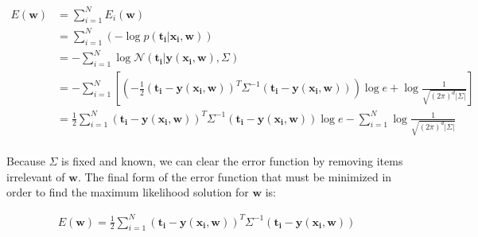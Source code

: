 \documentclass[twoside,11pt]{homework}
\newcommand{\vect}[1]{\boldsymbol{\mathbf{#1}}}
\begin{document}
\begin{align*}
E(\vect{w})
&= \sum_{i=1}^N E_i(\vect{w}) \\
&= \sum_{i=1}^N (- \log p(\vect{t_i} | \vect{x_i}, \vect{w}))\\
&= - \sum_{i=1}^N \log \mathcal{N} (\vect{t_i} | \vect{y(x_i, w)}, \vect{\varSigma}) \\
&=    - \sum_{i=1}^N  \left[   { \left( -\frac{1}{2} (\vect{t_i}- \vect{y(x_i, w)})^T \vect{\varSigma}^{-1} (\vect{t_i} - \vect{y(x_i, w)}) \right)} \log e +  \log \frac{1}{\sqrt{(2\pi)^d | \vect{\varSigma} |}}     \right]\\
&= \frac{1}{2} \sum_{i=1}^N (\vect{t_i}- \vect{y(x_i, w)})^T \vect{\varSigma}^{-1} (\vect{t_i} - \vect{y(x_i, w)}) \log e - \sum_{i=1}^N  \log \frac{1}{\sqrt{(2\pi)^d | \vect{\varSigma} |}}  \\
\end{align*}

Because $\vect{\varSigma}$ is fixed and known, we can clear the error function by removing items irrelevant of $\vect{w}$. The final form of the error function that must be minimized in order to find the maximum likelihood solution for $\vect{w}$ is:

\begin{align*}
E(\vect{w}) = \frac{1}{2} \sum_{i=1}^N (\vect{t_i}- \vect{y(x_i, w)})^T \vect{\varSigma}^{-1} (\vect{t_i} - \vect{y(x_i, w)})
\end{align*}







	
\end{document}
